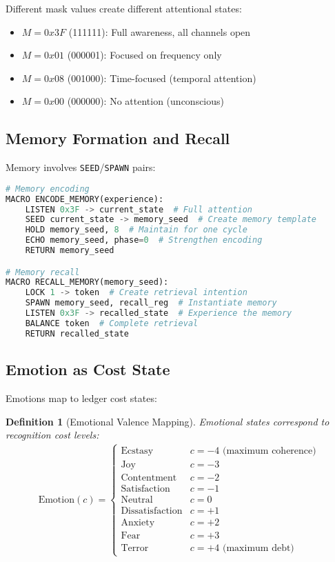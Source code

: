 \documentclass[12pt,a4paper]{article}
\newtheorem{definition}[theorem]{Definition}
\newcommand{\opcmd}[1]{\texttt{#1}}
\begin{document}
Different mask values create different attentional states:
\begin{itemize}
\item $M = 0x3F$ (111111): Full awareness, all channels open
\item $M = 0x01$ (000001): Focused on frequency only
\item $M = 0x08$ (001000): Time-focused (temporal attention)
\item $M = 0x00$ (000000): No attention (unconscious)
\end{itemize}

\subsection{Memory Formation and Recall}

Memory involves \opcmd{SEED}/\opcmd{SPAWN} pairs:

\begin{lstlisting}[language=Python, caption=Memory Operations]
# Memory encoding
MACRO ENCODE_MEMORY(experience):
    LISTEN 0x3F -> current_state  # Full attention
    SEED current_state -> memory_seed  # Create memory template
    HOLD memory_seed, 8  # Maintain for one cycle
    ECHO memory_seed, phase=0  # Strengthen encoding
    RETURN memory_seed

# Memory recall  
MACRO RECALL_MEMORY(memory_seed):
    LOCK 1 -> token  # Create retrieval intention
    SPAWN memory_seed, recall_reg  # Instantiate memory
    LISTEN 0x3F -> recalled_state  # Experience the memory
    BALANCE token  # Complete retrieval
    RETURN recalled_state
\end{lstlisting}

\subsection{Emotion as Cost State}

Emotions map to ledger cost states:

\begin{definition}[Emotional Valence Mapping]
Emotional states correspond to recognition cost levels:
\begin{align}
\text{Emotion}(c) = \begin{cases}
\text{Ecstasy} & c = -4 \text{ (maximum coherence)} \\
\text{Joy} & c = -3 \\
\text{Contentment} & c = -2 \\
\text{Satisfaction} & c = -1 \\
\text{Neutral} & c = 0 \\
\text{Dissatisfaction} & c = +1 \\
\text{Anxiety} & c = +2 \\
\text{Fear} & c = +3 \\
\text{Terror} & c = +4 \text{ (maximum debt)}
\end{cases}
\end{align}
\end{definition}
\end{document}

